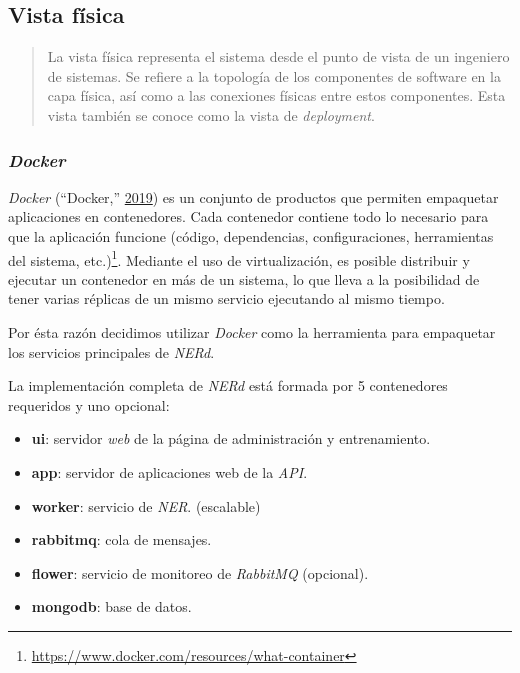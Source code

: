 \documentclass[12pt,a4paper,]{scrartcl}
\providecommand{\tightlist}{%
  \setlength{\itemsep}{0pt}\setlength{\parskip}{0pt}}
\begin{document}
\hypertarget{vista-fuxedsica}{%
\subsection{Vista física}\label{vista-fuxedsica}}

\begin{quote}
La vista física representa el sistema desde el punto de vista de un ingeniero de sistemas.
Se refiere a la topología de los componentes de software en la capa física, así como a las conexiones físicas entre estos componentes.
Esta vista también se conoce como la vista de \emph{deployment}.
\end{quote}

\hypertarget{docker}{%
\subsubsection{\texorpdfstring{\emph{Docker}}{Docker}}\label{docker}}

\emph{Docker} (``Docker,'' \protect\hyperlink{ref-docker}{2019}) es un conjunto de productos que permiten empaquetar aplicaciones en contenedores. Cada contenedor contiene todo lo necesario para que la aplicación funcione (código, dependencias, configuraciones, herramientas del sistema, etc.)\footnote{\url{https://www.docker.com/resources/what-container}}. Mediante el uso de virtualización, es posible distribuir y ejecutar un contenedor en más de un sistema, lo que lleva a la posibilidad de tener varias réplicas de un mismo servicio ejecutando al mismo tiempo.

Por ésta razón decidimos utilizar \emph{Docker} como la herramienta para empaquetar los servicios principales de \emph{NERd}.

La implementación completa de \emph{NERd} está formada por 5 contenedores requeridos y uno opcional:

\begin{itemize}
\tightlist
\item
  \textbf{ui}: servidor \emph{web} de la página de administración y entrenamiento.
\item
  \textbf{app}: servidor de aplicaciones web de la \emph{API}.
\item
  \textbf{worker}: servicio de \emph{NER}. (escalable)
\item
  \textbf{rabbitmq}: cola de mensajes.
\item
  \textbf{flower}: servicio de monitoreo de \emph{RabbitMQ} (opcional).
\item
  \textbf{mongodb}: base de datos.
\end{itemize}
\end{document}
